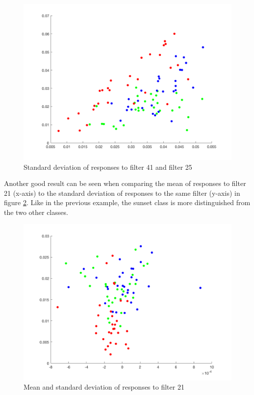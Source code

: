 \begin{figure}[!hbt]
  \includegraphics[width=\textwidth]{img/sd41_sd25}
    \caption{Standard deviation of responses to filter 41 and filter 25}
  \label{fig:sd41_sd25}
\end{figure}

Another good result can be seen when comparing the mean of responses to filter 21 (x-axis) to the standard deviation of responses to the same filter (y-axis) in figure \ref{fig:m21_sd21}. Like in the previous example, the sunset class is more distinguished from the two other classes. 

\begin{figure}[!hbt]
  \includegraphics[width=\textwidth]{img/m21_sd21}
    \caption{Mean and standard deviation of responses to filter 21}
  \label{fig:m21_sd21}
\end{figure}

